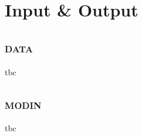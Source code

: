 \chapter{Input \& Output}

\section{\textsc{data}}\label{sec:data}

tbc

\section{\textsc{modin}}\label{sec:modin}

tbc